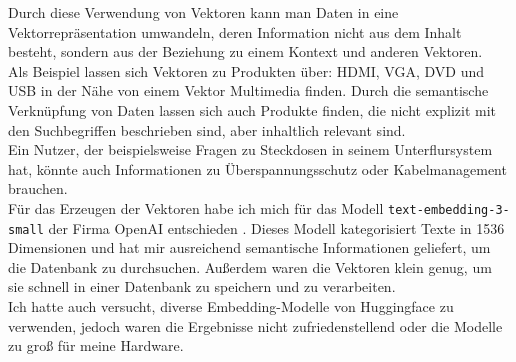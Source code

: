 Durch diese Verwendung von Vektoren kann man Daten in eine Vektorrepräsentation umwandeln, deren Information nicht aus dem Inhalt besteht, sondern aus  
der Beziehung zu einem Kontext und anderen Vektoren.\\  
Als Beispiel lassen sich Vektoren zu Produkten über: HDMI, VGA, DVD und USB in der Nähe von einem Vektor Multimedia finden.  
Durch die semantische Verknüpfung von Daten lassen sich auch Produkte finden, die nicht explizit mit den Suchbegriffen beschrieben sind, aber inhaltlich  
relevant sind.\\  
Ein Nutzer, der beispielsweise Fragen zu Steckdosen in seinem Unterflursystem hat, könnte auch Informationen zu Überspannungsschutz oder Kabelmanagement brauchen.\\  
Für das Erzeugen der Vektoren habe ich mich für das Modell \lstinline|text-embedding-3-small| der Firma OpenAI entschieden \cite{openai:Embeddings}.  
Dieses Modell kategorisiert Texte in 1536 Dimensionen und hat mir ausreichend semantische Informationen geliefert, um die Datenbank zu durchsuchen.  
Außerdem waren die Vektoren klein genug, um sie schnell in einer Datenbank zu speichern und zu verarbeiten.\\  
Ich hatte auch versucht, diverse Embedding-Modelle von Huggingface zu verwenden, jedoch waren die Ergebnisse nicht zufriedenstellend oder die Modelle zu groß für meine Hardware.\\

